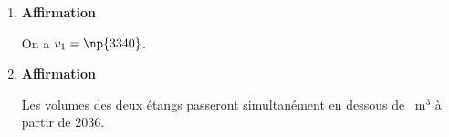 \begin{enumerate}[start=3]
	\item \textbf{Affirmation}

	On a $v_1 = \np{3340}$.

	\item \textbf{Affirmation}

	Les volumes des deux étangs passeront simultanément en dessous de ~m$^3$ à partir de 2036.
\end{enumerate}

\medskip
